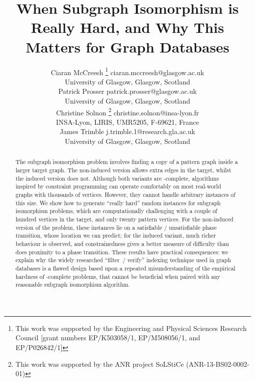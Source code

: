 \documentclass[twoside,11pt]{article}
\newcommand*\samethanks[1][\value{footnote}]{\footnotemark[#1]}
\begin{document}
\title{When Subgraph Isomorphism is Really Hard, and Why This Matters for Graph
Databases}

\author{\name Ciaran McCreesh \thanks{This work was supported by the Engineering and Physical Sciences
           Research Council [grant numbers EP/K503058/1, EP/M508056/1, and EP/P026842/1]} \email
           ciaran.mccreesh@glasgow.ac.uk \\
       \addr University of Glasgow, Glasgow, Scotland \\
       \name Patrick Prosser \samethanks[1] \email patrick.prosser@glasgow.ac.uk \\
       \addr University of Glasgow, Glasgow, Scotland \\
       \name Christine Solnon \thanks{This work was supported
       by the ANR project SoLStiCe (ANR-13-BS02-0002-01)} \email christine.solnon@insa-lyon.fr \\
       \addr INSA-Lyon, LIRIS, UMR5205, F-69621, France \\
       \name James Trimble \samethanks[1] \email j.trimble.1@research.gla.ac.uk \\
       \addr University of Glasgow, Glasgow, Scotland}
\maketitle

\begin{abstract}
    The subgraph isomorphism problem involves finding a copy of a pattern graph inside a larger
    target graph. The non-induced version allows extra edges in the target, whilst the induced
    version does not.  Although both variants are \NP-complete, algorithms inspired by constraint programming
    can operate comfortably on most real-world graphs with thousands of vertices.  However, they
    cannot handle arbitrary instances of this size. We show how to generate ``really hard'' random
    instances for subgraph isomorphism problems, which are computationally challenging with a couple
    of hundred vertices in the target, and only twenty pattern vertices. For the non-induced version
    of the problem, these instances lie on a satisfiable / unsatisfiable phase transition, whose
    location we can predict; for the induced variant, much richer behaviour is observed, and
    constrainedness gives a better measure of difficulty than does proximity to a phase transition.
    These results have practical consequences: we explain why the widely researched ``filter~/
    verify'' indexing technique used in graph databases is a flawed design based upon a repeated
    misunderstanding of the empirical hardness of \NP-complete problems, that cannot be beneficial
    when paired with any reasonable subgraph isomorphism algorithm.
\end{abstract}
\end{document}
